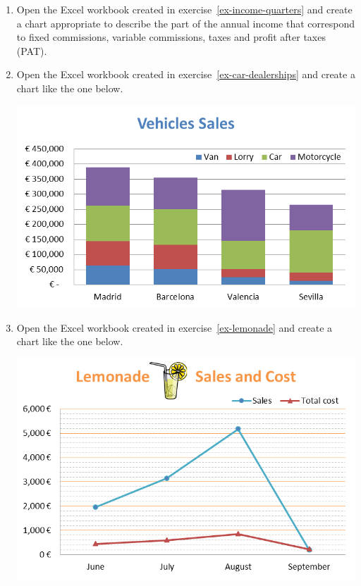\begin{enumerate}[leftmargin=*,resume]
\item Open the Excel workbook created in exercise~\ref{ex-income-quarters} and create a chart appropriate to describe
the part of the annual income that correspond to fixed commissions, variable commissions, taxes and profit after taxes
(PAT).

\item Open the Excel workbook created in exercise~\ref{ex-car-dealerships} and create a chart like the one below.
\begin{center}
\includegraphics[scale=0.8]{img/car-dealerships}
\end{center}

\item Open the Excel workbook created in exercise~\ref{ex-lemonade} and create a chart like the one below.
\begin{center}
\includegraphics[scale=0.8]{img/lemonade}
\end{center}


\end{enumerate}
